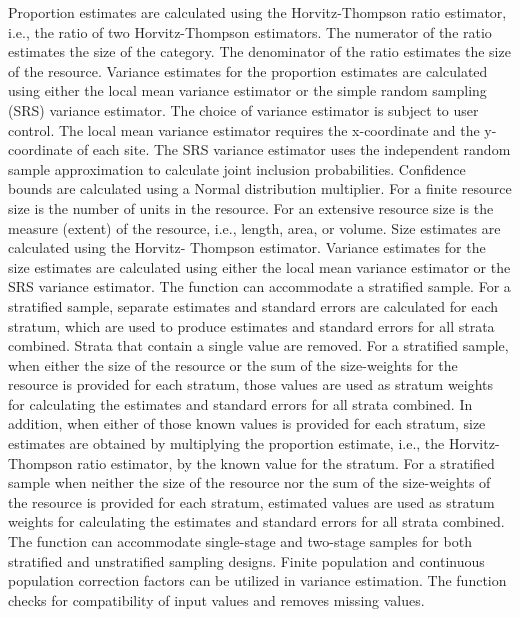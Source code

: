 \begin{Details}\relax
Proportion estimates are calculated using the Horvitz-Thompson ratio estimator,
i.e., the ratio of two Horvitz-Thompson estimators.  The numerator of the ratio
estimates the size of the category.  The denominator of the ratio
estimates the size of the resource.   Variance estimates for the proportion
estimates are calculated using either the local mean variance estimator or the
simple random sampling (SRS) variance estimator.  The choice of variance
estimator is subject to user control.  The local mean variance estimator
requires the x-coordinate and the y-coordinate of each site.  The
SRS variance estimator uses the independent  random sample approximation
to calculate joint inclusion probabilities.   Confidence bounds are calculated
using a Normal distribution multiplier.  For a finite resource size is
the number of units in the resource.  For an extensive resource size is the 
measure (extent) of the resource, i.e., length, area, or volume.  Size 
estimates are calculated using the Horvitz- Thompson estimator.  Variance 
estimates for the size estimates are calculated using either the local mean 
variance estimator or the SRS variance estimator. The function can 
accommodate a stratified sample.  For a stratified sample, separate estimates 
and standard errors are calculated for each stratum, which are used to produce 
estimates and standard errors for all strata combined.  Strata that contain a 
single value are removed.  For a stratified sample, when either the size of the
resource or the sum of the size-weights for the resource is provided for each 
stratum, those values are used as  stratum weights for calculating the 
estimates and standard errors for all strata combined.  In addition, when 
either of those known values is provided for each stratum, size estimates are 
obtained by multiplying the proportion estimate, i.e., the Horvitz-Thompson 
ratio estimator, by the known value for the stratum.  For a stratified sample 
when neither the size of the  resource nor the sum of the size-weights of the 
resource is provided for  each stratum, estimated values are used as stratum 
weights for calculating  the estimates and standard errors for all strata 
combined.  The function can accommodate single-stage and two-stage samples for 
both stratified and unstratified sampling designs.  Finite population and 
continuous population correction factors can be utilized in variance 
estimation.  The function checks for compatibility of input values and removes
missing values.
\end{Details}
